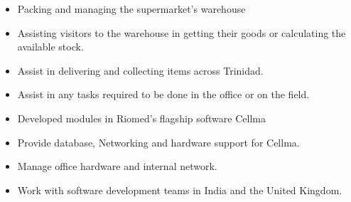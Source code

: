 \documentclass[10pt,a4paper,normalphoto]{altacv}
\begin{document}

\begin{fullwidth}
\makecvheader
\end{fullwidth}


\begin{itemize}
\item Packing and managing the supermarket's warehouse 
\item Assisting visitors to the warehouse in getting their goods or calculating the available stock. 
\end{itemize}

\divider

\begin{itemize}
\item Assist in delivering and collecting items across Trinidad.
\item Assist in any tasks required to be done in the office or on the field.
\end{itemize}

\divider

\begin{itemize}
\item Developed modules in Riomed's flagship software Cellma
\item Provide database, Networking and hardware support for Cellma.
\item Manage office hardware and internal network.
\item Work with software development teams in India and the United Kingdom.
\end{itemize}
\end{document}
